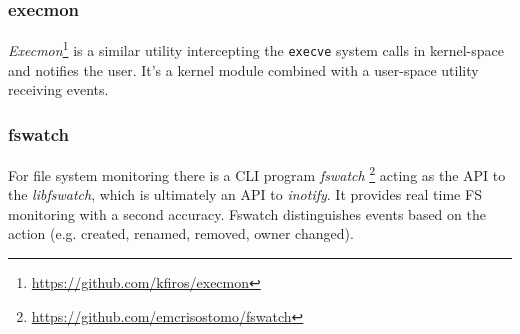 \subsubsection*{execmon}
\textit{Execmon}\footnote{\url{https://github.com/kfiros/execmon}} is a similar utility intercepting the \texttt{execve} system calls in kernel-space and notifies the user. It's a kernel module combined with a user-space utility receiving events.

\subsubsection*{fswatch}
For file system monitoring there is a CLI program \textit{fswatch} \footnote{\url{https://github.com/emcrisostomo/fswatch}} acting as the API to the \textit{libfswatch}, which is ultimately an API to \textit{inotify}. It provides real time FS monitoring with a second accuracy. Fswatch distinguishes events based on the action (e.g. created, renamed, removed, owner changed).